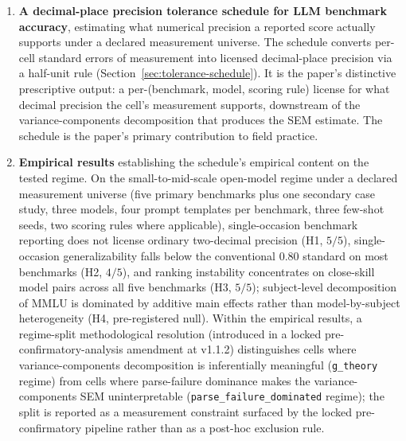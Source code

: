 \documentclass[11pt]{article}
\begin{document}
\begin{sloppypar}
\begin{enumerate}
  \item \textbf{A decimal-place precision tolerance schedule for LLM benchmark accuracy}, estimating what numerical precision a reported score actually supports under a declared measurement universe. The schedule converts per-cell standard errors of measurement into licensed decimal-place precision via a half-unit rule (Section~\ref{sec:tolerance-schedule}). It is the paper's distinctive prescriptive output: a per-(benchmark, model, scoring rule) license for what decimal precision the cell's measurement supports, downstream of the variance-components decomposition that produces the SEM estimate. The schedule is the paper's primary contribution to field practice.

  \item \textbf{Empirical results} establishing the schedule's empirical content on the tested regime. On the small-to-mid-scale open-model regime under a declared measurement universe (five primary benchmarks plus one secondary case study, three models, four prompt templates per benchmark, three few-shot seeds, two scoring rules where applicable), single-occasion benchmark reporting does not license ordinary two-decimal precision (H1, $5/5$), single-occasion generalizability falls below the conventional $0.80$ standard on most benchmarks (H2, $4/5$), and ranking instability concentrates on close-skill model pairs across all five benchmarks (H3, $5/5$); subject-level decomposition of MMLU is dominated by additive main effects rather than model-by-subject heterogeneity (H4, pre-registered null). Within the empirical results, a regime-split methodological resolution (introduced in a locked pre-confirmatory-analysis amendment at v1.1.2) distinguishes cells where variance-components decomposition is inferentially meaningful (\texttt{g\_theory} regime) from cells where parse-failure dominance makes the variance-components SEM uninterpretable (\texttt{parse\_failure\_dominated} regime); the split is reported as a measurement constraint surfaced by the locked pre-confirmatory pipeline rather than as a post-hoc exclusion rule.


\end{enumerate}
\end{sloppypar}
\end{document}
